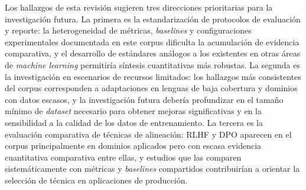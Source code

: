 Los hallazgos de esta revisión sugieren tres direcciones prioritarias para la investigación futura. La primera es la estandarización de protocolos de evaluación y reporte: la heterogeneidad de métricas, \textit{baselines} y configuraciones experimentales documentada en este corpus dificulta la acumulación de evidencia comparativa, y el desarrollo de estándares análogos a los existentes en otras áreas de \textit{machine learning} permitiría síntesis cuantitativas más robustas. La segunda es la investigación en escenarios de recursos limitados: los hallazgos más consistentes del corpus corresponden a adaptaciones en lenguas de baja cobertura y dominios con datos escasos, y la investigación futura debería profundizar en el tamaño mínimo de \textit{dataset} necesario para obtener mejoras significativas y en la sensibilidad a la calidad de los datos de entrenamiento. La tercera es la evaluación comparativa de técnicas de alineación: RLHF y DPO aparecen en el corpus principalmente en dominios aplicados pero con escasa evidencia cuantitativa comparativa entre ellas, y estudios que las comparen sistemáticamente con métricas y \textit{baselines} compartidos contribuirían a orientar la selección de técnica en aplicaciones de producción.